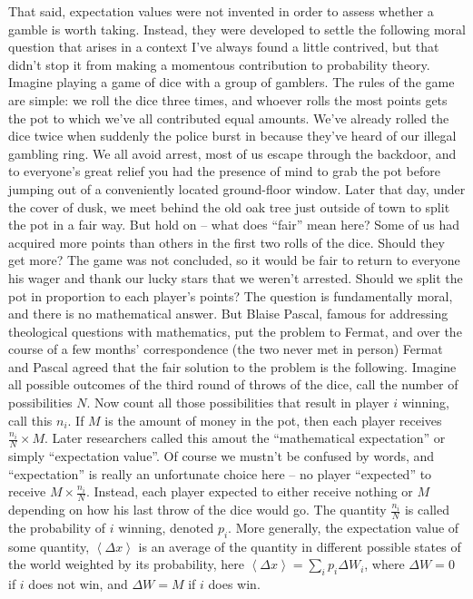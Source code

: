 \documentclass[a4paper]{article}
\newcommand{\ave}[1]{\left\langle#1 \right\rangle}
\begin{document}
That said, expectation values were not invented in order to 
assess whether a gamble is worth taking. Instead, they were 
developed to settle the following moral question that arises 
in a context I've always found a little contrived, but that 
didn't stop it from making a momentous contribution to 
probability theory. Imagine playing a game of dice with a 
group of gamblers. The rules of the game are simple: we 
roll the dice three times,  and whoever rolls the most points 
gets the pot to which we've all contributed equal amounts. 
We've already rolled the dice twice when suddenly the 
police burst in because they've heard of our illegal gambling ring. 
We all avoid arrest, most of us escape through the backdoor, 
and to everyone's great relief you had the presence of mind 
to grab the pot before jumping out of a conveniently located 
ground-floor window. Later that day, under the cover of dusk, 
we meet behind the old oak tree just outside of town to split 
the pot in a fair way. But hold on -- what does ``fair'' mean here?
Some of us had acquired more points than others in the first 
two rolls of the dice. Should they get more? The game was 
not concluded, so it would be fair to return to everyone his 
wager and thank our lucky stars that we weren't arrested. 
Should we split the pot in proportion to each player's points? 
The question is fundamentally moral, and there is no 
mathematical answer. But Blaise Pascal, famous for 
addressing theological questions with mathematics, put the 
problem to Fermat, and over the course of a few months' 
correspondence (the two never met in person) Fermat and 
Pascal agreed that the fair solution to the problem is the 
following. Imagine all possible outcomes of the third round 
of throws of the dice, call the number of possibilities $N$. 
Now count all those possibilities that result in player $i$ winning, 
call this $n_i$. If $M$ is the amount of money in the pot, then 
each player receives $\frac{n_i}{N}\times M$. Later researchers 
called this amout the ``mathematical expectation''  or simply 
``expectation value''. Of course we mustn't be confused by 
words, and ``expectation'' is really an unfortunate choice here
 -- no player ``expected'' to receive $M\times \frac{n_i}{N}$. 
Instead, each player expected to either receive nothing or $M$ 
depending on how his last throw of the dice would go. The 
quantity $\frac{n_i}{N}$ is called the probability of $i$ winning, 
denoted $p_i$. More generally, the expectation value of some 
quantity, $\ave{\Delta x}$ is an average of the quantity in 
different possible states of the world weighted by its 
probability, here $\ave{\Delta x}=\sum_i p_i \Delta W_i$, 
where $\Delta W=0$ if $i$ does not win, and $ \Delta 
W=M$ if $i$ does win. 
\end{document}
